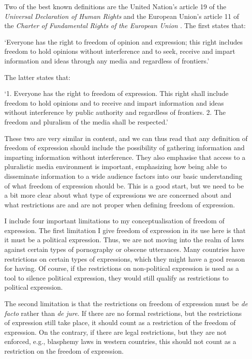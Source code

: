 Two of the best known definitions are the United Nation's article 19 of the \textit{Universal Declaration of Human Rights} \citeyearpar{un_general_assembly_universal_1948} and the European Union's article 11 of the \textit{Charter of Fundamental Rights of the European Union} \citeyearpar{european_parliament_charter_2012}. The first states that:
\begin{displayquote}
`Everyone has the right to freedom of opinion and expression; this right includes freedom to hold opinions without interference and to seek, receive and impart information and ideas through any media and regardless of frontiers.' \citep{un_general_assembly_universal_1948}
\end{displayquote}
The latter states that:
\begin{displayquote}
`1. Everyone has the right to freedom of expression. This right shall include freedom to hold opinions and to receive and impart information and ideas without interference by public authority and regardless of frontiers.
2. The freedom and pluralism of the media shall be respected.' \citep{european_parliament_charter_2012}
\end{displayquote}
These two are very similar in content, and we can thus read that any definition of freedom of expression should include the possibility of gathering information and imparting information without interference. They also emphasise that access to a pluralistic media environment is important, emphasizing how being able to disseminate information to a wide audience factors into our basic understanding of what freedom of expression should be. This is a good start, but we need to be a bit more clear about what type of expressions we are concerned about and what restrictions are and are not proper when defining freedom of expression. 

I include four important limitations to my conceptualisation of freedom of expression. The first limitation I give freedom of expression in its use here is that it must be a political expression. Thus, we are not moving into the realm of laws against certain types of pornography \citep[pp. 6-7]{bonotti_freedom_2021} or obscene utterances. Many countries have restrictions on certain types of expressions, which they might have a good reason for having. Of course, if the restrictions on non-political expression is used as a tool to silence political expression, they would still qualify as restrictions to political expression.

The second limitation is that the restrictions on freedom of expression must be \textit{de facto} rather than \textit{de jure}. If there are no formal restrictions, but the restrictions of expression still take place, it should count as a restriction of the freedom of expression. On the contrary, if there are legal restrictions, but they are not enforced, e.g., blasphemy laws in western countries, this should not count as a restriction on the freedom of expression. 

